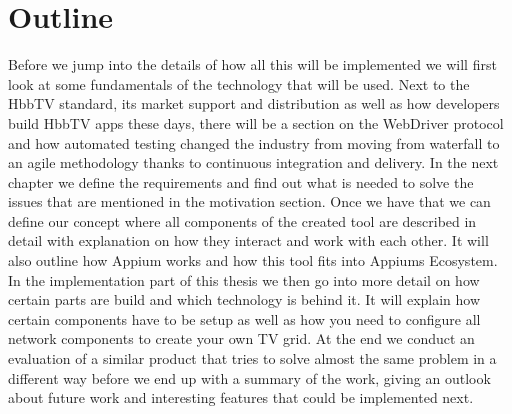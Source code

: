 \section{Outline\label{sec:outline}}

Before we jump into the details of how all this will be implemented we will first look at some fundamentals of the technology that will be used. Next to the HbbTV standard, its market support and distribution as well as how developers build HbbTV apps these days, there will be a section on the WebDriver protocol and how automated testing changed the industry from moving from waterfall to an agile methodology thanks to continuous integration and delivery. In the next chapter we define the requirements and find out what is needed to solve the issues that are mentioned in the motivation section. Once we have that we can define our concept where all components of the created tool are described in detail with explanation on how they interact and work with each other. It will also outline how Appium works and how this tool fits into Appiums Ecosystem. In the implementation part of this thesis we then go into more detail on how certain parts are build and which technology is behind it. It will explain how certain components have to be setup as well as how you need to configure all network components to create your own TV grid. At the end we conduct an evaluation of a similar product that tries to solve almost the same problem in a different way before we end up with a summary of the work, giving an outlook about future work and interesting features that could be implemented next.
